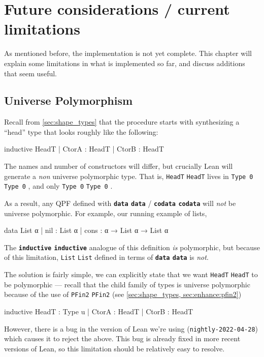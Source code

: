 \documentclass[titlepage]{report}
\newcommand\lean[1]{%
\ifx\leanmode\undefined%
\def\leanmode{1}%
\texttt{\small #1}%
\undef\leanmode%
\else%
\texttt{#1}%
\fi%
}
\newcommand\keyword[1]{{\color{keywordcolor} \textbf{\lean{#1}}}}
\newcommand\inductive{{\keyword{inductive}}}
\newcommand\data{\keyword{data}}
\newcommand\codata{\keyword{codata}}
\begin{document}
\chapter{Future considerations / current limitations}
\label{ch:limitations}


As mentioned before, the implementation is not yet complete.
This chapter will explain some limitations in what is implemented so far, and discuss
additions that seem useful.

\section{Universe Polymorphism}

Recall from \ref{sec:shape_types} that the procedure starts with synthesizing a ``head'' type that
looks roughly like the following:
\begin{leancode}
  inductive HeadT
    | CtorA : HeadT
    | CtorB : HeadT
\end{leancode}
The names and number of constructors will differ, but crucially Lean will generate a \emph{non} universe 
polymorphic type. That is, \lean{HeadT} lives in \lean{Type 0}, and only \lean{Type 0}.

As a result, any QPF defined with \data{}/\codata{} will \emph{not} be universe polymorphic.
For example, our running example of lists,
\begin{leancode}
  data List α 
    | nil  : List α
    | cons : α → List α → List α
\end{leancode}

The \inductive{} analogue of this definition \emph{is} polymorphic, but because of this limitation,
\lean{List} defined in terms of \data{} is \emph{not}.
  

The solution is fairly simple, we can explicitly state that we want \lean{HeadT} to be polymorphic
--- recall that the child family of types is universe polymorphic because of the use of \lean{PFin2} (see \ref{sec:shape_types, sec:enhance:pfin2})
\begin{badleancode}

  inductive HeadT : Type u
    | CtorA : HeadT
    | CtorB : HeadT

\end{badleancode}

However, there is a bug in the version of Lean we're using (\texttt{nightly-2022-04-28}) 
which causes it to reject the above. 
This bug is already fixed in more recent versions of Lean, 
so this limitation should be relatively easy to resolve.
\end{document}
